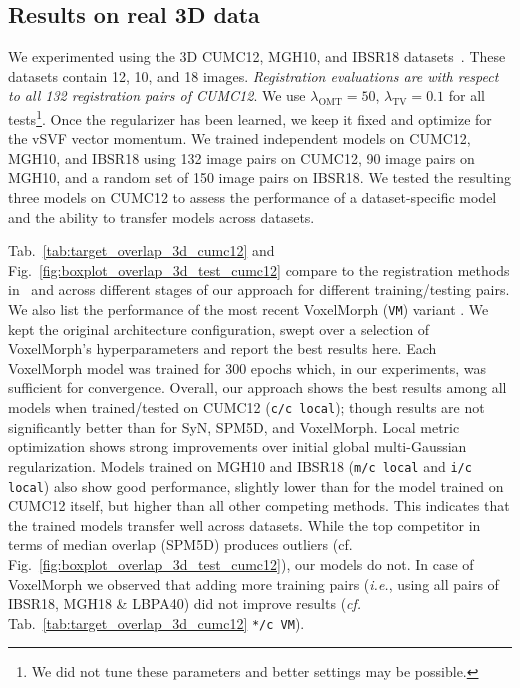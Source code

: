 \documentclass[10pt,twocolumn,letterpaper,table]{article}
\numberwithin{equation}{section}
\theoremstyle{plain}
\theoremstyle{definition}
\def\ie{\emph{i.e.}}  \def\Ie{\emph{I.e.}}
\begin{document}
\subsection{Results on real 3D data} 
\label{subsec:real_3d_experiment}

We experimented using the 3D CUMC12, MGH10, and IBSR18 datasets~\cite{klein2009}. These datasets contain 12, 10, and 18 images. \emph{Registration evaluations are with respect to all 132 registration pairs of CUMC12}. We use $\lambda_{\text{OMT}}=50$, $\lambda_{\text{TV}}=0.1$ for all tests\footnote{We did not tune these parameters and better settings may be possible.}. Once the regularizer has been learned, we keep it fixed and optimize for the vSVF vector momentum. We trained independent models on CUMC12, MGH10, and IBSR18 using 132 image pairs on CUMC12, 90 image pairs on MGH10, and a random set of 150 image pairs on IBSR18. We tested the resulting three models on CUMC12 to assess the performance of a dataset-specific model and the ability to transfer models across datasets.

Tab.~\ref{tab:target_overlap_3d_cumc12} and Fig.~\ref{fig:boxplot_overlap_3d_test_cumc12} compare to the registration methods in~\cite{klein2009} and across different stages of our approach for different training/testing pairs. We also list the 
performance of the most recent VoxelMorph (\texttt{VM}) variant \cite{Dalca18a}. We kept the original architecture configuration, swept over a selection of VoxelMorph's hyperparameters and report the best results here. Each VoxelMorph model was trained for 300 epochs which, in our
experiments, was sufficient for convergence. Overall, our approach shows the best results among all models when trained/tested on CUMC12 (\texttt{c/c local}); though results are not significantly better than for SyN, SPM5D, and VoxelMorph. Local metric optimization shows strong improvements over initial global multi-Gaussian regularization. Models trained on MGH10 and IBSR18 (\texttt{m/c local} and \texttt{i/c local}) also show good performance, slightly lower than for the model trained on CUMC12 itself, but higher than all other competing methods. This indicates that the trained models transfer well across datasets. While the top competitor in terms of median overlap (SPM5D) produces outliers (cf. Fig.~\ref{fig:boxplot_overlap_3d_test_cumc12}), our models do not. In case of VoxelMorph we observed that adding more training pairs (\ie, using all pairs of IBSR18, MGH18 \& LBPA40)  did not improve results (\emph{cf.} Tab.~\ref{tab:target_overlap_3d_cumc12} \texttt{*/c VM}). 
\end{document}
